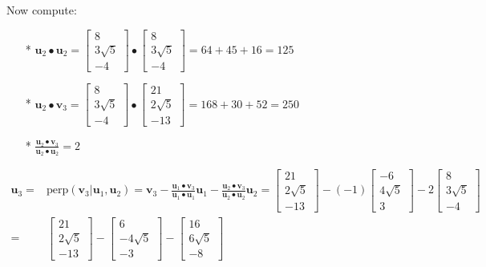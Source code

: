 \documentclass{article}
\begin{document}
\begin{description}
Now compute:
\begin{itemize}
\item[*] \(\mathbf{u}_2 \bullet \mathbf{u}_2 = \begin{bmatrix} 8 \\ 3\sqrt{5} \\ -4 \end{bmatrix} \bullet \begin{bmatrix} 8 \\ 3\sqrt{5} \\ -4 \end{bmatrix} = 64 + 45 + 16 = 125\)
\item[*] \(\mathbf{u}_2 \bullet \mathbf{v}_3 = \begin{bmatrix} 8 \\ 3\sqrt{5} \\ -4 \end{bmatrix} \bullet \begin{bmatrix} 21 \\ 2\sqrt{5} \\ -13 \end{bmatrix} = 168 + 30 + 52 = 250\)
\item[*] \(\frac{\mathbf{u}_2 \bullet \mathbf{v}_3}{\mathbf{u}_2 \bullet \mathbf{u}_2} = 2\)
\end{itemize}
\begin{align*}
\mathbf{u}_3 = & \text{perp}(\mathbf{v}_3 | \mathbf{u}_1, \mathbf{u}_2) = \mathbf{v}_3 - \frac{\mathbf{u}_1 \bullet \mathbf{v}_3}{\mathbf{u}_1 \bullet \mathbf{u}_1}\mathbf{u}_1 - \frac{\mathbf{u}_2 \bullet \mathbf{v}_3}{\mathbf{u}_2 \bullet \mathbf{u}_2}\mathbf{u}_2 
= \begin{bmatrix} 21 \\ 2\sqrt{5} \\ -13 \end{bmatrix} - (-1)\begin{bmatrix} -6 \\ 4 \sqrt{5} \\ 3 \end{bmatrix} - 2\begin{bmatrix} 8 \\ 3\sqrt{5} \\ -4 \end{bmatrix} \\
= & \begin{bmatrix} 21 \\ 2\sqrt{5} \\ -13 \end{bmatrix} - \begin{bmatrix} 6 \\ -4\sqrt{5} \\ -3 \end{bmatrix} - \begin{bmatrix} 16 \\ 6\sqrt{5} \\ -8 \end{bmatrix} 

\end{align*}
\end{description}
\end{document}
